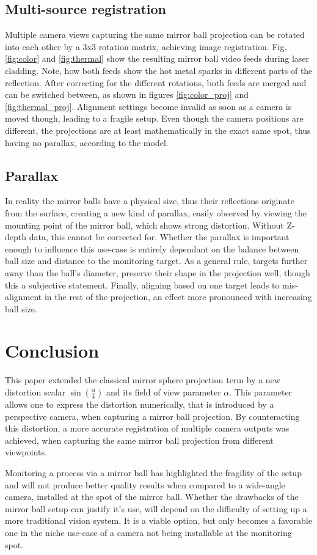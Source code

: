 \documentclass[10pt]{article}
\begin{document}
\begin{multicols}{2}
	\subsection{Multi-source registration}
	Multiple camera views capturing the same mirror ball projection can be rotated into each other by a 3x3 rotation matrix, achieving image registration. Fig. \ref{fig:color} and \ref{fig:thermal} show the resulting mirror ball video feeds during laser cladding. Note, how both feeds show the hot metal sparks in different parts of the reflection. After correcting for the different rotations, both feeds are merged and can be switched between, as shown in figures \ref{fig:color_proj} and \ref{fig:thermal_proj}. Alignment settings become invalid as soon as a camera is moved though, leading to a fragile setup. Even though the camera positions are different, the projections are at least mathematically in the exact same spot, thus having no parallax, according to the model.
	
	\subsection{Parallax}\label{parallax}
	In reality the mirror balls have a physical size, thus their reflections originate from the surface, creating a new kind of parallax, easily observed by viewing the mounting point of the mirror ball, which shows strong distortion. Without Z-depth data, this cannot be corrected for. Whether the parallax is important enough to influence this use-case is entirely dependant on the balance between ball size and distance to the monitoring target. As a general rule, targets further away than the ball's diameter, preserve their shape in the projection well, though this a subjective statement. Finally, aligning based on one target leads to mis-alignment in the rest of the projection, an effect more pronounced with increasing ball size.

	\section{Conclusion}
	This paper extended the classical mirror sphere projection term by a new distortion scalar $\sin{\left(\frac{\alpha}{4}\right)}$ and its field of view parameter $\alpha$. This parameter allows one to express the distortion numerically, that is introduced by a perspective camera, when capturing a mirror ball projection. By counteracting this distortion, a more accurate registration of multiple camera outputs was achieved, when capturing the same mirror ball projection from different viewpoints.

	Monitoring a process via a mirror ball has highlighted the fragility of the setup and will not produce better quality results when compared to a wide-angle camera, installed at the spot of the mirror ball. Whether the drawbacks of the mirror ball setup can justify it's use, will depend on the difficulty of setting up a more traditional vision system. It is a viable option, but only becomes a favorable one in the niche use-case of a camera not being installable at the monitoring spot.

	\pagebreak
	
\end{multicols}
\end{document}
